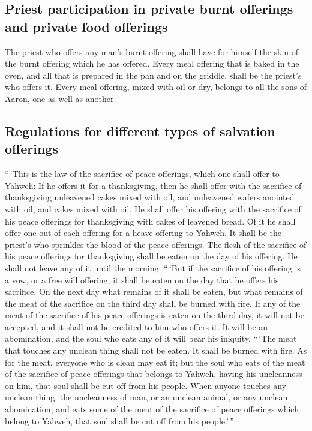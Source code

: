 \hypertarget{priest-participation-in-private-burnt-offerings-and-private-food-offerings}{%
\subsection{Priest participation in private burnt offerings and private
food
offerings}\label{priest-participation-in-private-burnt-offerings-and-private-food-offerings}}

 The priest who offers any man's burnt offering shall have
for himself the skin of the burnt offering which he has offered.
 Every meal offering that is baked in the oven, and all
that is prepared in the pan and on the griddle, shall be the priest's
who offers it.  Every meal offering, mixed with oil or
dry, belongs to all the sons of Aaron, one as well as another.

\hypertarget{regulations-for-different-types-of-salvation-offerings}{%
\subsection{Regulations for different types of salvation
offerings}\label{regulations-for-different-types-of-salvation-offerings}}

 ``\,`This is the law of the sacrifice of peace
offerings, which one shall offer to Yahweh:  If he offers
it for a thanksgiving, then he shall offer with the sacrifice of
thanksgiving unleavened cakes mixed with oil, and unleavened wafers
anointed with oil, and cakes mixed with oil.  He shall
offer his offering with the sacrifice of his peace offerings for
thanksgiving with cakes of leavened bread.  Of it he
shall offer one out of each offering for a heave offering to Yahweh. It
shall be the priest's who sprinkles the blood of the peace offerings.
 The flesh of the sacrifice of his peace offerings for
thanksgiving shall be eaten on the day of his offering. He shall not
leave any of it until the morning.  ``\,`But if the
sacrifice of his offering is a vow, or a free will offering, it shall be
eaten on the day that he offers his sacrifice. On the next day what
remains of it shall be eaten,  but what remains of the
meat of the sacrifice on the third day shall be burned with fire.
 If any of the meat of the sacrifice of his peace
offerings is eaten on the third day, it will not be accepted, and it
shall not be credited to him who offers it. It will be an abomination,
and the soul who eats any of it will bear his iniquity. 
``\,`The meat that touches any unclean thing shall not be eaten. It
shall be burned with fire. As for the meat, everyone who is clean may
eat it;  but the soul who eats of the meat of the
sacrifice of peace offerings that belongs to Yahweh, having his
uncleanness on him, that soul shall be cut off from his people.
 When anyone touches any unclean thing, the uncleanness
of man, or an unclean animal, or any unclean abomination, and eats some
of the meat of the sacrifice of peace offerings which belong to Yahweh,
that soul shall be cut off from his people.'\,''

